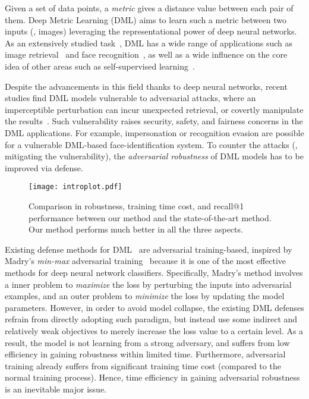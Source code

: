 \documentclass[10pt,twocolumn,letterpaper]{article}
\begin{document}

Given a set of data points, a \emph{metric} gives a distance value between each
pair of them.
%
Deep Metric Learning (DML) aims to learn such a metric between two inputs (\eg,
images) leveraging the representational power of deep neural networks.
%
As an extensively studied task~\cite{revisiting}, DML has a wide range of
applications such as image retrieval~\cite{imagesim2} and face
recognition~\cite{facenet,domainface}, as well as a wide influence on the core
idea of other areas such as self-supervised learning~\cite{dmlreality}.

Despite the advancements in this field thanks to deep neural
networks, recent studies find DML models vulnerable to
adversarial attacks, where an imperceptible perturbation can incur unexpected
retrieval, or covertly manipulate the results~\cite{advrank,advorder}.
%
Such vulnerability raises security, safety, and fairness concerns in the
DML applications.
%
For example, impersonation or recognition evasion are possible for a
vulnerable DML-based face-identification system.
%
To counter the attacks (\ie, mitigating the vulnerability), the
\emph{adversarial robustness} of DML models has to be improved via defense.

\begin{figure}[t]
	\texttt{[image: introplot.pdf]}
	\caption{
		Comparison in robustness, training time cost, and recall@1 performance
		between our method and the state-of-the-art method.
		Our method performs much better in all the three aspects.
	}
	\label{fig:introplot}
\end{figure}


Existing defense methods for DML~\cite{advrank,robrank} are adversarial
training-based, inspired by Madry's \emph{min-max} adversarial
training~\cite{madry} because it is one of the most effective methods for deep
neural network classifiers.
%
Specifically, Madry's method involves a inner problem to \emph{maximize} the
loss by perturbing the inputs into adversarial examples, and an outer problem
to \emph{minimize} the loss by updating the model parameters.
%
However, in order to avoid model collapse, the existing DML defenses refrain
from directly adopting such paradigm, but instead use some indirect and
relatively weak objectives to merely increase the loss value to a certain
level.
%
As a result, the model is not learning from a strong adversary, and suffers
from low efficiency in gaining robustness within limited time. 
%
Furthermore, adversarial training already suffers from significant training
time cost (compared to the normal training process).
%
Hence, time efficiency in gaining adversarial robustness
is an inevitable major issue.
\end{document}
